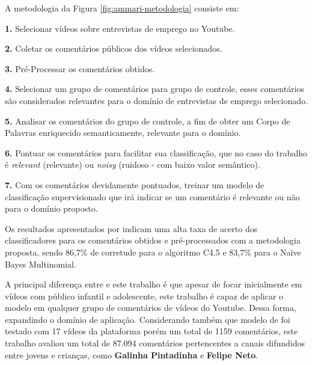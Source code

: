 A metodologia da Figura \ref{fig:ammari-metodologia} consiste em:

\textbf{1.} Selecionar vídeos sobre entrevistas de emprego no Youtube.

\textbf{2.} Coletar os comentários públicos dos vídeos selecionados.

\textbf{3.} Pré-Processar os comentários obtidos.

\textbf{4.} Selecionar um grupo de comentários para grupo de controle, esses comentários são considerados relevantes para o domínio de entrevistas de emprego selecionado.

\textbf{5.} Analisar os comentários do grupo de controle, a fim de obter um Corpo de Palavras enriquecido semanticamente, relevante para o domínio.

\textbf{6.} Pontuar os comentários para facilitar sua classificação, que no caso do trabalho \cite{ammari2011filteringYt} é \textit{relevant} (relevante) ou \textit{noisy} (ruidoso - com baixo valor semântico).

\textbf{7.} Com os comentários devidamente pontuados, treinar um modelo de classificação supervisionado que irá indicar se um comentário é relevante ou não para o domínio proposto.

Os resultados apresentados por \cite{ammari2011filteringYt} indicam uma alta taxa de acerto dos classificadores para os comentários obtidos e pré-processados com a metodologia proposta, sendo 86,7\% de corretude para o algoritmo C4.5 e 83,7\% para o Naïve Bayes Multinomial.

A principal diferença entre \cite{ammari2011filteringYt} e este trabalho é que apesar de focar inicialmente em vídeos com público infantil e adolescente, este trabalho é capaz de aplicar o modelo em qualquer grupo de comentários de vídeos do Youtube. Dessa forma, expandindo o domínio de aplicação. Considerando também que modelo de \cite{ammari2011filteringYt} foi testado com 17 vídeos da plataforma porém um total de 1159 comentários, este trabalho avaliou um total de 87.094 comentários pertencentes a canais difundidos entre jovens e crianças, como \textbf{Galinha Pintadinha} e \textbf{Felipe Neto}.



